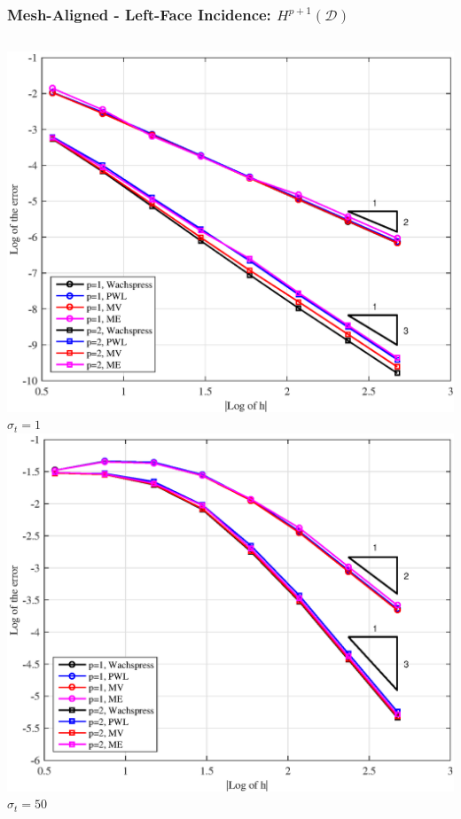 \documentclass[compress,10pt]{beamer}
\begin{document}
\begin{frame}[t]
{\begin{columns}
\end{columns}
}
{
\frametitle{Mesh-Aligned - Left-Face Incidence: $H^{p+1} (\mathcal{D})$}
\vspace{1.00cm}
\begin{columns}[c]
\centering
{}\includegraphics[width=\textwidth]{images/PAErr_Left_SplitPoly_sig1.eps} \\
$\sigma_t = 1$
\centering
{}\includegraphics[width=\textwidth]{images/PAErr_Left_SplitPoly_sig50.eps} \\
$\sigma_t = 50$
\end{columns}
}
\end{frame}
\end{document}
